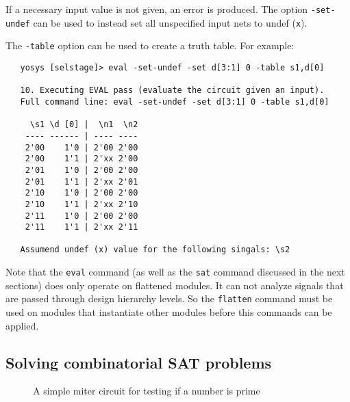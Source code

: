 \documentclass[9pt,technote,a4paper]{IEEEtran}
\begin{document}
If a necessary input value is not given, an error is produced. The option
{\tt -set-undef} can be used to instead set all unspecified input nets to
undef ({\tt x}).

The {\tt -table} option can be used to create a truth table. For example:

{\scriptsize
\begin{verbatim}
   yosys [selstage]> eval -set-undef -set d[3:1] 0 -table s1,d[0]
   
   10. Executing EVAL pass (evaluate the circuit given an input).
   Full command line: eval -set-undef -set d[3:1] 0 -table s1,d[0]
   
     \s1 \d [0] |  \n1  \n2
    ---- ------ | ---- ----
    2'00    1'0 | 2'00 2'00
    2'00    1'1 | 2'xx 2'00
    2'01    1'0 | 2'00 2'00
    2'01    1'1 | 2'xx 2'01
    2'10    1'0 | 2'00 2'00
    2'10    1'1 | 2'xx 2'10
    2'11    1'0 | 2'00 2'00
    2'11    1'1 | 2'xx 2'11
   
   Assumend undef (x) value for the following singals: \s2
\end{verbatim}
}

Note that the {\tt eval} command (as well as the {\tt sat} command discussed in
the next sections) does only operate on flattened modules. It can not analyze
signals that are passed through design hierarchy levels. So the {\tt flatten}
command must be used on modules that instantiate other modules before this
commands can be applied.

\subsection{Solving combinatorial SAT problems}

\begin{figure}[b]

\caption{A simple miter circuit for testing if a number is prime}
\label{primetest}
\end{figure}
\end{document}
